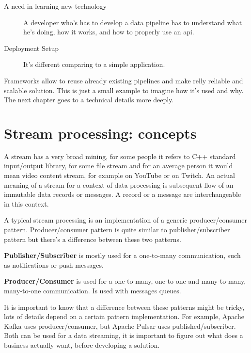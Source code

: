 \begin{description}
    \item[A need in learning new technology] A developer who's has to develop a data pipeline
    has to understand what he's doing, how it works, and how to properly use an api.
    \item[Deployment Setup] It's different comparing to a simple application.
\end{description}

Frameworks allow to reuse already existing pipelines and make relly reliable
and scalable solution.
This is just a small example to imagine how it's used and why.
The next chapter goes to a technical details more deeply.


\section{Stream processing: concepts}\label{sec:-concepts}
%
%

A stream has a very broad mining, for some people it refers to
C++ standard input/output library, for some file stream and
for an average person it would mean video content stream, for example
on YouTube or on Twitch.
An actual meaning of a stream for a context of data processing
is subsequent flow of an immutable data records or messages.
A record or a message are interchangeable in this context.

A typical stream processing is an implementation of a generic producer/consumer pattern.
Producer/consumer pattern is quite similar to publisher/subscriber pattern but there's
a difference between these two patterns.

\textbf{Publisher/Subscriber} is mostly used for a one-to-many communication,
such as notifications or push messages.

\textbf{Producer/Consumer} is used for a one-to-many, one-to-one and many-to-many,
many-to-one communication.
Is used with messages queues.

It is important to know that a difference between these patterns might be tricky,
lots of details depend on a certain pattern implementation.
For example, Apache Kafka uses producer/consumer, but Apache Pulsar uses published/subscriber.
Both can be used for a data streaming, it is important to figure out what does a business
actually want, before developing a solution.

